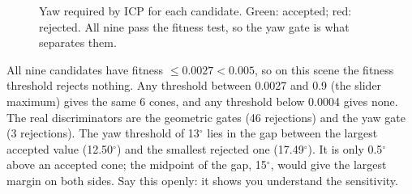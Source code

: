 \documentclass[10pt,a4paper]{scrartcl}
\renewcommand{\emph}[1]{\textcolor{accent}{#1}}
\begin{document}
  \begin{figure}[H]
  \centering
  \caption{Yaw required by ICP for each candidate. Green: accepted; red: rejected.
  All nine pass the fitness test, so the yaw gate is what separates them.}
  \label{fig:yaw}
  \end{figure}

  \begin{warnbox}
  \small
  All nine candidates have fitness $\le0.0027<0.005$, so \emph{on this scene the fitness
  threshold rejects nothing}. Any threshold between 0.0027 and 0.9 (the slider maximum)
  gives the same 6 cones, and any threshold below 0.0004 gives none. The real
  discriminators are the geometric gates (46 rejections) and the yaw gate (3 rejections).
  The yaw threshold of 13$^\circ$ lies in the gap between the largest accepted value
  (12.50$^\circ$) and the smallest rejected one (17.49$^\circ$). It is only
  0.5$^\circ$ above an accepted cone; the midpoint of the gap, 15$^\circ$, would give the
  largest margin on both sides. Say this openly: it shows you understand the
  sensitivity.
  \end{warnbox}
\end{document}
